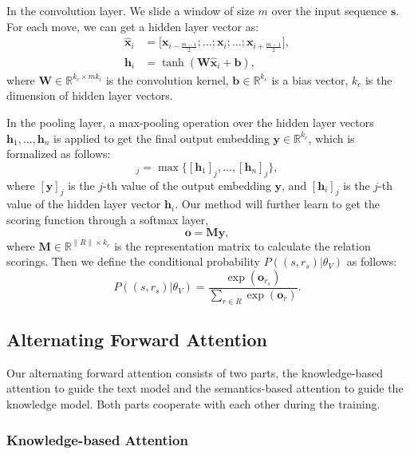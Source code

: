\documentclass[letterpaper]{article} %
\begin{document}
In the convolution layer. We slide a window of size $m$ over the input sequence $\mathbf{s}$. For each move, we can get a hidden layer vector as:
\begin{align}
\mathbf{\hat{x}}_i &= \big[ \mathbf{x}_{i - \frac{m-1}{2}}; \ldots ; \mathbf{x}_i; \ldots ;\mathbf{x}_{i + \frac{m-1}{2}} \big],\\
\mathbf{h}_i &= \tanh(\mathbf{W}\mathbf{\hat{x}}_i + \mathbf{b}),
\end{align}
where $\mathbf{W} \in \mathbb{R}^{k_c \times mk_i}$ is the convolution kernel, $\mathbf{b} \in \mathbb{R}^{k_c}$ is a bias vector, $k_c$ is the dimension of hidden layer vectors.

In the pooling layer, a max-pooling operation over the hidden layer vectors ${\mathbf{h}_1, \ldots , \mathbf{h}_n}$ is applied to get the final output embedding $\mathbf{y} \in \mathbb{R}^{k_c} $, which is formalized as follows:
\begin{equation}
[\mathbf{y}]_{j} = \max \{[\mathbf{h}_{1}]_{j}, \ldots, [\mathbf{h}_{n}]_{j} \},
\end{equation}
where $[\mathbf{y}]_{j}$ is the $j$-th value of the output embedding $\mathbf{y}$, and $[\mathbf{h}_{i}]_{j}$ is the $j$-th value of the hidden layer vector $\mathbf{h}_i$. Our method will further learn to get the scoring function through a softmax layer,
\begin{equation}
\mathbf{o} = \mathbf{M}\mathbf{y},
\label{eq:cnn_distance}
\end{equation}
where $\mathbf{M} \in \mathbb{R}^{\|R\| \times k_c} $ is the representation matrix to calculate the relation scorings. Then we define the conditional probability $P((s, r_s)|{\theta_V})$ as follows:
\begin{equation}
P((s, r_s)|{\theta_V}) = \frac{\exp(\mathbf{o}_{r_s})}{\sum_{r \in R} \exp(\mathbf{o}_{r})}.
\label{eq:cnn_distance1}
\end{equation}

\subsection{Alternating Forward Attention}

Our alternating forward attention consists of two parts, the knowledge-based attention to guide the text model and the semantics-based attention to guide the knowledge model. Both parts cooperate with each other during the training.

\subsubsection{Knowledge-based Attention}
\end{document}
